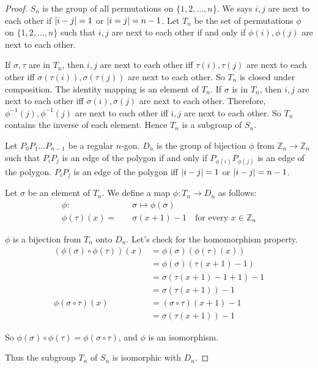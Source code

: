 \begin{proof}
    $S_{n}$ is the group of all permutations on $\{ 1, 2, \ldots, n \}$. We says $i, j$ are next to each other if $\left\vert{i - j}\right\vert = 1$ or $\left\vert{i = j}\right\vert = n - 1$. Let $T_{n}$ be the set of permutations $\phi$ on $\{ 1, 2, \ldots, n \}$ such that $i, j$ are next to each other if and only if $\phi(i), \phi(j)$ are next to each other.

    If $\sigma, \tau$ are in $T_{n}$, then $i, j$ are next to each other iff $\tau(i), \tau(j)$ are next to each other iff $\sigma(\tau(i)), \sigma(\tau(j))$ are next to each other. So $T_{n}$ is closed under composition. The identity mapping is an element of $T_{n}$. If $\sigma$ is in $T_{n}$, then $i, j$ are next to each other iff $\sigma(i), \sigma(j)$ are next to each other. Therefore, $\phi^{-1}(j), \phi^{-1}(j)$ are next to each other iff $i, j$ are next to each other. So $T_{n}$ contains the inverse of each element. Hence $T_{n}$ is a subgroup of $S_{n}$.

    Let $P_{0}P_{1}\ldots P_{n-1}$ be a regular $n$-gon. $D_{n}$ is the group of bijection $\phi$ from $\mathbb{Z}_{n} \to \mathbb{Z}_{n}$ such that $P_{i}P_{j}$ is an edge of the polygon if and only if $P_{\phi(i)}P_{\phi(j)}$ is an edge of the polygon. $P_{i}P_{j}$ is an edge of the polygon iff $\left\vert{i - j}\right\vert = 1$ or $\left\vert{i - j}\right\vert = n - 1$.

    Let $\sigma$ be an element of $T_{n}$. We define a map $\phi: T_{n} \to D_{n}$ as follows:
    \begin{align*}
        \phi:          & \quad\sigma \mapsto \phi(\sigma)                                  \\
        \phi(\tau)(x)= & \quad\sigma(x + 1) - 1\quad \text{for every $x\in\mathbb{Z}_{n}$}
    \end{align*}

    $\phi$ is a bijection from $T_{n}$ onto $D_{n}$. Let's check for the homomorphism property.
    \begin{align*}
        (\phi(\sigma)\circ\phi(\tau))(x) & = \phi(\sigma)(\phi(\tau)(x))     \\
                                         & = \phi(\sigma)(\tau(x + 1) - 1)   \\
                                         & = \sigma(\tau(x + 1) - 1 + 1) - 1 \\
                                         & = \sigma(\tau(x + 1)) - 1         \\
        \phi(\sigma\circ\tau)(x)         & = (\sigma\circ\tau)(x + 1) - 1    \\
                                         & = \sigma(\tau(x + 1)) - 1
    \end{align*}

    So $\phi(\sigma)\circ\phi(\tau) = \phi(\sigma\circ\tau)$, and $\phi$ is an isomorphism.

    Thus the subgroup $T_{n}$ of $S_{n}$ is isomorphic with $D_{n}$.
\end{proof}


